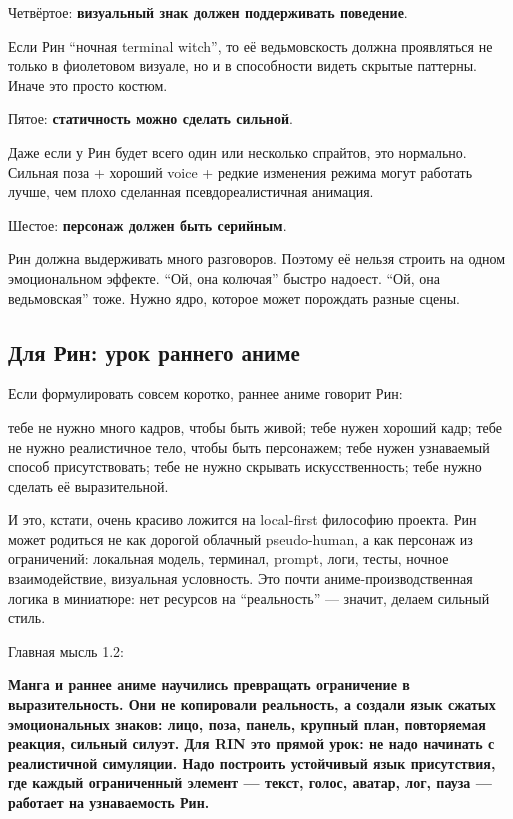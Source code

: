 Четвёртое: \textbf{визуальный знак должен поддерживать поведение}.

Если Рин ``ночная terminal witch'', то её ведьмовскость должна
проявляться не только в фиолетовом визуале, но и в способности видеть
скрытые паттерны. Иначе это просто костюм.

Пятое: \textbf{статичность можно сделать сильной}.

Даже если у Рин будет всего один или несколько спрайтов, это нормально.
Сильная поза + хороший voice + редкие изменения режима могут работать
лучше, чем плохо сделанная псевдореалистичная анимация.

Шестое: \textbf{персонаж должен быть серийным}.

Рин должна выдерживать много разговоров. Поэтому её нельзя строить на
одном эмоциональном эффекте. ``Ой, она колючая'' быстро надоест. ``Ой,
она ведьмовская'' тоже. Нужно ядро, которое может порождать разные
сцены.

\subsection*{Для Рин: урок раннего аниме}

Если формулировать совсем коротко, раннее аниме говорит Рин:

тебе не нужно много кадров, чтобы быть живой; тебе нужен хороший кадр;
тебе не нужно реалистичное тело, чтобы быть персонажем; тебе нужен
узнаваемый способ присутствовать; тебе не нужно скрывать
искусственность; тебе нужно сделать её выразительной.

И это, кстати, очень красиво ложится на local-first философию проекта.
Рин может родиться не как дорогой облачный pseudo-human, а как персонаж
из ограничений: локальная модель, терминал, prompt, логи, тесты, ночное
взаимодействие, визуальная условность. Это почти аниме-производственная
логика в миниатюре: нет ресурсов на ``реальность'' --- значит, делаем
сильный стиль.

Главная мысль 1.2:

\textbf{Манга и раннее аниме научились превращать ограничение в
выразительность. Они не копировали реальность, а создали язык сжатых
эмоциональных знаков: лицо, поза, панель, крупный план, повторяемая
реакция, сильный силуэт. Для RIN это прямой урок: не надо начинать с
реалистичной симуляции. Надо построить устойчивый язык присутствия, где
каждый ограниченный элемент --- текст, голос, аватар, лог, пауза ---
работает на узнаваемость Рин.}
